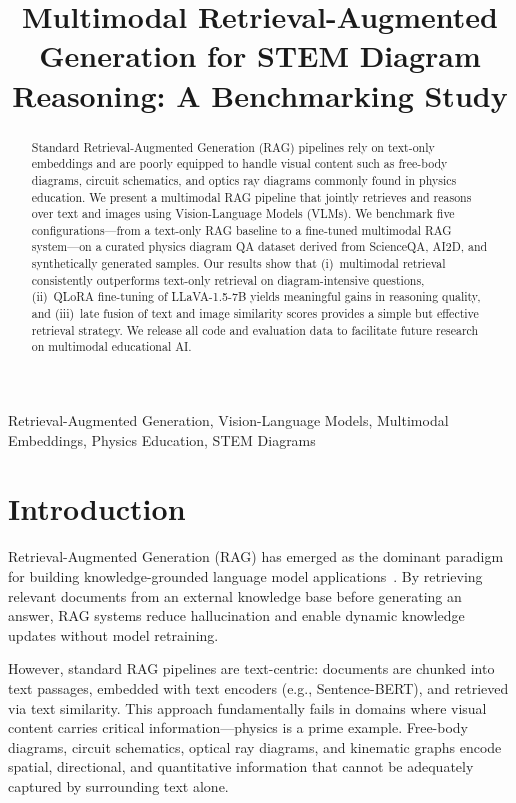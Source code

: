 \documentclass[conference]{IEEEtran}
\title{Multimodal Retrieval-Augmented Generation for STEM Diagram Reasoning: A Benchmarking Study}
\author{
\IEEEauthorblockN{[Your Name]}
\IEEEauthorblockA{[Your University]\\
[your.email@university.edu]}
}
\begin{document}
\maketitle

\begin{abstract}
Standard Retrieval-Augmented Generation (RAG) pipelines rely on text-only embeddings and are poorly equipped to handle visual content such as free-body diagrams, circuit schematics, and optics ray diagrams commonly found in physics education.
We present a multimodal RAG pipeline that jointly retrieves and reasons over text and images using Vision-Language Models (VLMs).
We benchmark five configurations---from a text-only RAG baseline to a fine-tuned multimodal RAG system---on a curated physics diagram QA dataset derived from ScienceQA, AI2D, and synthetically generated samples.
Our results show that (i)~multimodal retrieval consistently outperforms text-only retrieval on diagram-intensive questions, (ii)~QLoRA fine-tuning of LLaVA-1.5-7B yields meaningful gains in reasoning quality, and (iii)~late fusion of text and image similarity scores provides a simple but effective retrieval strategy.
We release all code and evaluation data to facilitate future research on multimodal educational AI.
\end{abstract}

\begin{IEEEkeywords}
Retrieval-Augmented Generation, Vision-Language Models, Multimodal Embeddings, Physics Education, STEM Diagrams
\end{IEEEkeywords}

\section{Introduction}
\label{sec:intro}

Retrieval-Augmented Generation (RAG) has emerged as the dominant paradigm for building knowledge-grounded language model applications~\cite{lewis2020rag}.
By retrieving relevant documents from an external knowledge base before generating an answer, RAG systems reduce hallucination and enable dynamic knowledge updates without model retraining.

However, standard RAG pipelines are text-centric: documents are chunked into text passages, embedded with text encoders (e.g., Sentence-BERT), and retrieved via text similarity.
This approach fundamentally fails in domains where visual content carries critical information---physics is a prime example.
Free-body diagrams, circuit schematics, optical ray diagrams, and kinematic graphs encode spatial, directional, and quantitative information that cannot be adequately captured by surrounding text alone.
\end{document}
